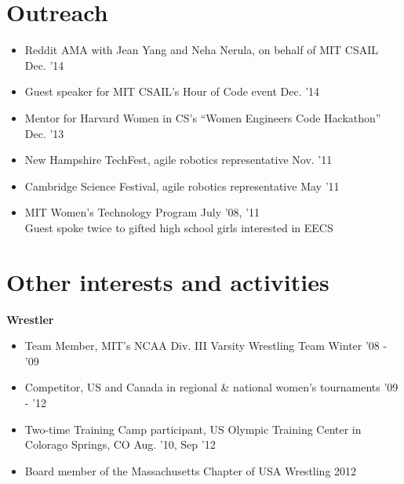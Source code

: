 \documentclass[margin]{res}
\begin{document}
\begin{resume}
\section{Outreach}
\begin{itemize}[leftmargin=*] \itemsep -2pt
\item Reddit AMA with Jean Yang and Neha Nerula, on behalf of MIT CSAIL \hfill Dec. '14
\item Guest speaker for MIT CSAIL's Hour of Code event \hfill Dec. '14
\item Mentor for Harvard Women in CS's ``Women Engineers Code Hackathon'' \hfill Dec. '13
\item New Hampshire TechFest, agile robotics representative \hfill Nov. '11
\item Cambridge Science Festival, agile robotics representative \hfill May '11
\item MIT Women's Technology Program \hfill July '08, '11 \\
Guest spoke twice to gifted high school girls interested in EECS
\end{itemize}

\section{Other interests and activities}
{\bf Wrestler}
\begin{itemize}[leftmargin=*] \itemsep -2pt
\item Team Member, MIT's NCAA Div. III Varsity Wrestling Team \hfill Winter '08 - '09
\item Competitor, US and Canada in regional \& national women's tournaments \hfill '09 - '12
\item Two-time Training Camp participant, US Olympic Training Center in Colorago Springs, CO \hfill Aug. '10, Sep '12
\item Board member of the Massachusetts Chapter of USA Wrestling \hfill 2012


\end{itemize}

\end{resume} 
 
\end{document}
